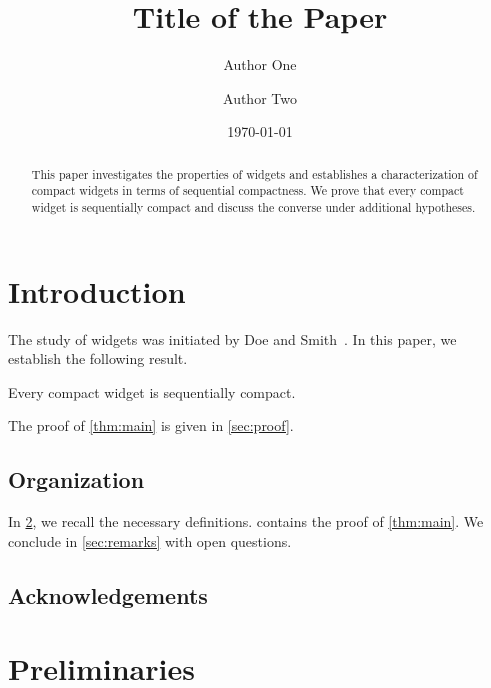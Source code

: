 \documentclass[12pt]{amsart}
\title{Title of the Paper}
\author{Author One}
\author{Author Two}
\date{\today}
\begin{document}
\begin{abstract}
  This paper investigates the properties of widgets
  and establishes a characterization of compact widgets
  in terms of sequential compactness.
  We prove that every compact widget is sequentially compact
  and discuss the converse under additional hypotheses.
\end{abstract}

\maketitle


\section{Introduction}\label{sec:introduction}

The study of widgets was initiated by Doe and Smith~\cite{placeholder2025}.
In this paper, we establish the following result.

\begin{theorem}\label{thm:main}
  Every compact widget is sequentially compact.
\end{theorem}

The proof of \cref{thm:main} is given in \cref{sec:proof}.

\subsection*{Organization}

In \cref{sec:preliminaries}, we recall the necessary definitions.
 contains the proof of \cref{thm:main}.
We conclude in \cref{sec:remarks} with open questions.

\subsection*{Acknowledgements}



\section{Preliminaries}\label{sec:preliminaries}
\end{document}
